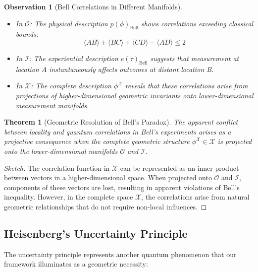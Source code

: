 \documentclass{article}
\newtheorem{theorem}{Theorem}
\newtheorem{observation}{Observation}
\begin{document}
\begin{observation}[Bell Correlations in Different Manifolds]
\begin{itemize}
\item In $\mathcal{O}$: The physical description $p(\phi)_\text{Bell}$ shows correlations exceeding classical bounds:
\begin{equation}
\langle AB \rangle + \langle BC \rangle + \langle CD \rangle - \langle AD \rangle \leq 2
\end{equation}
\item In $\mathcal{I}$: The experiential description $e(\tau)_\text{Bell}$ suggests that measurement at location A instantaneously affects outcomes at distant location B.
\item In $\mathcal{X}$: The complete description $\phi^{\mathcal{X}}$ reveals that these correlations arise from projections of higher-dimensional geometric invariants onto lower-dimensional measurement manifolds.
\end{itemize}
\end{observation}

\begin{theorem}[Geometric Resolution of Bell's Paradox]
The apparent conflict between locality and quantum correlations in Bell's experiments arises as a projective consequence when the complete geometric structure $\phi^{\mathcal{X}} \in \mathcal{X}$ is projected onto the lower-dimensional manifolds $\mathcal{O}$ and $\mathcal{I}$.
\end{theorem}

\begin{proof}[Sketch]
The correlation function in $\mathcal{X}$ can be represented as an inner product between vectors in a higher-dimensional space. When projected onto $\mathcal{O}$ and $\mathcal{I}$, components of these vectors are lost, resulting in apparent violations of Bell's inequality. However, in the complete space $\mathcal{X}$, the correlations arise from natural geometric relationships that do not require non-local influences.
\end{proof}

\subsection{Heisenberg's Uncertainty Principle}

The uncertainty principle represents another quantum phenomenon that our framework illuminates as a geometric necessity:
\end{document}
